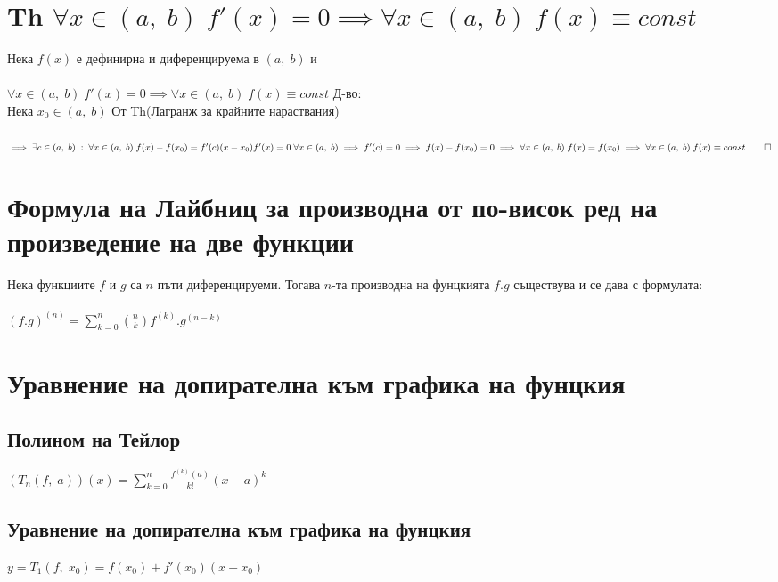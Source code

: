 \documentclass[12pt]{article}
\begin{document}
\section*{Th \(\forall x \in (a, \; b) \; f'(x) = 0 \implies \forall x \in (a, \; b) \; f(x) \equiv const\)}
Нека \(f(x)\) е дефинирна и диференцируема в \((a, \; b)\) и \\\\
\(\forall x \in (a, \; b) \; f'(x) = 0 \implies \forall x \in (a, \; b) \; f(x) \equiv const\)
\bigbreak
Д-во:\\
Нека \(x_0 \in (a, \; b)\) От Th(Лагранж за крайните нараствания) \\\\
\(\implies \exists c \in (a, \; b) \; : \; \forall x \in (a, \; b) \; f(x) - f(x_0) = f'(c)(x - x_0) \\\\
f'(x) = 0 \; \forall x \in (a, \; b) \implies f'(c) = 0 \implies f(x) - f(x_0) = 0 \\\\
\implies \forall x \in (a, \; b) \; f(x) = f(x_0) \implies \forall x \in (a, \; b) \; f(x) \equiv const \qed\)

\section*{Формула на Лайбниц за производна от по-висок ред на произведение на две функции}
Нека функциите $f$ и $g$ са $n$ пъти диференцируеми. Тогава $n$-та производна на фунцкията $f.g$
съществува и се дава с формулата: \\\\
$(f.g)^{(n)} = \displaystyle\sum_{k = 0}^n \binom{n}{k} f^{(k)}.g^{(n - k)}$

\section*{Уравнение на допирателна към графика на фунцкия}
\subsection*{Полином на Тейлор}
\((T_n(f, \; a))(x) = \displaystyle\sum_{k = 0}^n \frac{f^{(k)}(a)}{k!}(x - a)^k\)
\subsection*{Уравнение на допирателна към графика на фунцкия}
\(y = T_1(f, \; x_0) = f(x_0) + f'(x_0)(x - x_0)\) \\\\
\end{document}
